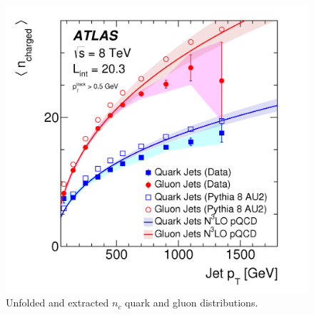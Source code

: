 {\begin{figure}[h!]
  \centering
  \includegraphics[width=\hsize]{figures/QGT/extracted_qg.png}
  \caption{Unfolded and extracted $n_{c}$ quark and gluon distributions.}
  \label{fig:extracted_qg}
\end{figure}
\FloatBarrier

}
